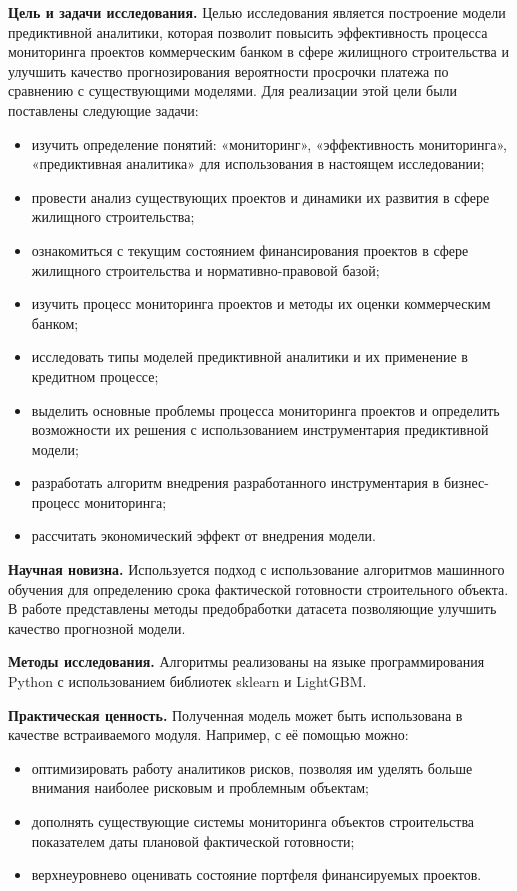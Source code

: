 \documentclass[12pt,a4paper]{article} %
\begin{document}
\textbf{Цель и задачи исследования.} Целью исследования является построение модели предиктивной аналитики, которая позволит повысить эффективность процесса мониторинга проектов коммерческим банком в сфере жилищного строительства и улучшить качество прогнозирования вероятности просрочки платежа по сравнению с существующими моделями. Для реализации этой цели были поставлены следующие задачи:
\begin{itemize}
	\item изучить определение понятий: «мониторинг», «эффективность мониторинга», «предиктивная аналитика» для использования в настоящем исследовании;
	\item провести анализ существующих проектов и динамики их развития в сфере жилищного строительства;
	\item ознакомиться с текущим состоянием финансирования проектов в сфере жилищного строительства и нормативно-правовой базой;
	\item изучить процесс мониторинга проектов и методы их оценки коммерческим банком;
	\item исследовать типы моделей предиктивной аналитики и их применение в кредитном процессе;
	\item выделить основные проблемы процесса мониторинга проектов и определить возможности их решения с использованием инструментария предиктивной модели; 
	\item разработать алгоритм внедрения разработанного инструментария в бизнес-процесс мониторинга;
	\item рассчитать экономический эффект от внедрения модели.
\end{itemize}

\bigskip

\textbf{Научная новизна.} Используется подход с использование алгоритмов машинного обучения для определению срока фактической готовности строительного объекта. В работе представлены методы предобработки датасета позволяющие улучшить качество прогнозной модели.

\bigskip

\textbf{Методы исследования.} Алгоритмы реализованы на языке программирования Python с использованием библиотек sklearn и LightGBM.

\bigskip

\textbf{Практическая ценность.} Полученная модель может быть использована в качестве встраиваемого модуля. Например, с её помощью можно:
\begin{itemize}
	\item оптимизировать работу аналитиков рисков, позволяя им уделять больше внимания наиболее рисковым и проблемным объектам;
	\item дополнять существующие системы мониторинга объектов строительства показателем даты плановой фактической готовности;
	\item верхнеуровнево оценивать состояние портфеля финансируемых проектов.
\end{itemize}
\end{document}
